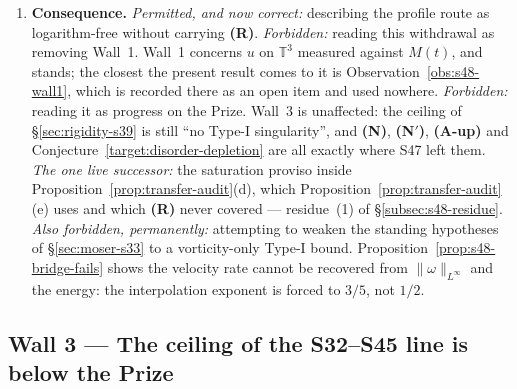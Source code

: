 \documentclass[11pt]{article}
\theoremstyle{definition}
\theoremstyle{remark}
\newcommand{\T}{\mathbb{T}}
\begin{document}
\begin{enumerate}[label=(\alph*),leftmargin=2.2em]
    range of Serrin's criterion \cite{Serrin1962,ChenGaldiPoggiSchikorra2026},
    where boundedness suffices and no smallness is required. The S47 entry
    looked for \textbf{(R)} on the $\varepsilon$-regularity shelf
    (\cite{CKN1982,LadyzhenskayaSeregin1999,Seregin2012}), where the
    smallness-versus-boundedness objection is real; the statement is not on
    that shelf. Its quantitative, scale-invariant form comes from the
    $L^\infty$-based local theory of \cite[\S4]{KNSS2009} and
    \cite[Thm.~2.4]{SereginSverak2009}, neither of which uses a local energy,
    a pressure norm, or a smallness hypothesis. Remark~\ref{rem:s48-mechanism}
    corrects the mechanism stated inside
    Proposition~\ref{prop:transfer-audit}(d): the logarithm is not
    \emph{removed} on the profile, it is never \emph{incurred}, because the
    profile route does not pass through the Calder\'on--Zygmund operator.
  \item \textbf{Consequence.} \emph{Permitted, and now correct:} describing
    the profile route as logarithm-free without carrying \textbf{(R)}.
    \emph{Forbidden:} reading this withdrawal as removing Wall~1. Wall~1
    concerns $u$ on $\T^3$ measured against $M(t)$, and stands; the closest
    the present result comes to it is Observation~\ref{obs:s48-wall1}, which
    is recorded there as an open item and used nowhere.
    \emph{Forbidden:} reading it as progress on the Prize. Wall~3 is
    unaffected: the ceiling of \S\ref{sec:rigidity-s39} is still ``no Type-I
    singularity'', and \textbf{(N)}, \textbf{(N$'$)}, \textbf{(A-up)} and
    Conjecture~\ref{target:disorder-depletion} are all exactly where S47 left
    them. \emph{The one live successor:} the saturation proviso inside
    Proposition~\ref{prop:transfer-audit}(d), which
    Proposition~\ref{prop:transfer-audit}(e) uses and which \textbf{(R)} never
    covered --- residue~(1) of \S\ref{subsec:s48-residue}.
    \emph{Also forbidden, permanently:} attempting to weaken the standing
    hypotheses of \S\ref{sec:moser-s33} to a vorticity-only Type-I bound.
    Proposition~\ref{prop:s48-bridge-fails} shows the velocity rate cannot be
    recovered from $\|\omega\|_{L^\infty}$ and the energy: the interpolation
    exponent is forced to $3/5$, not $1/2$.
\end{enumerate}

\subsection{Wall 3 --- The ceiling of the S32--S45 line is below the Prize}
\label{subsec:wall3-typeII}
\end{document}
